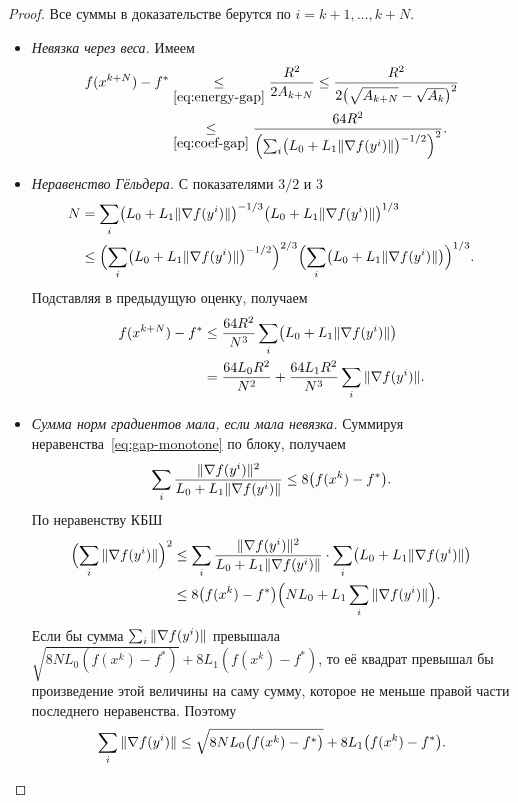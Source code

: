\begin{proof}
Все суммы в доказательстве берутся по $i=k+1,\dots,k+N$.
\begin{itemize}
\item \emph{Невязка через веса.} Имеем
\begin{align*}
 f(x^{k+N})-f^\ast
 &\mathrel{\underset{\eqref{eq:energy-gap}}{\le}}\frac{R^2}{2A_{k+N}}
 \le\frac{R^2}{2\bigl(\sqrt{A_{k+N}}-\sqrt{A_k}\bigr)^2}\\
 &\mathrel{\underset{\eqref{eq:coef-gap}}{\le}}\frac{64R^2}{\Bigl(\sum_i\bigl(L_0+L_1\|\nabla f(y^i)\|\bigr)^{-1/2}\Bigr)^2} .
\end{align*}
\item \emph{Неравенство Гёльдера.} С показателями $3/2$ и $3$
\begin{align*}
 N&=\sum_i\bigl(L_0+L_1\|\nabla f(y^i)\|\bigr)^{-1/3}\bigl(L_0+L_1\|\nabla f(y^i)\|\bigr)^{1/3}\\
 &\le\Bigl(\sum_i\bigl(L_0+L_1\|\nabla f(y^i)\|\bigr)^{-1/2}\Bigr)^{2/3}\Bigl(\sum_i\bigl(L_0+L_1\|\nabla f(y^i)\|\bigr)\Bigr)^{1/3} .
\end{align*}
Подставляя в предыдущую оценку, получаем
\begin{equation}\label{eq:block-g}
\begin{aligned}
 f(x^{k+N})-f^\ast
 &\le\frac{64R^2}{N^3}\sum_i\bigl(L_0+L_1\|\nabla f(y^i)\|\bigr)\\
 &=\frac{64L_0R^2}{N^2}+\frac{64L_1R^2}{N^3}\sum_i\|\nabla f(y^i)\| .
\end{aligned}
\end{equation}
\item \emph{Сумма норм градиентов мала, если мала невязка.} Суммируя неравенства~\eqref{eq:gap-monotone} по блоку, получаем
\[
 \sum_i\frac{\|\nabla f(y^i)\|^2}{L_0+L_1\|\nabla f(y^i)\|}\le8\bigl(f(x^k)-f^\ast\bigr).
\]
По неравенству КБШ
\begin{align*}
 \Bigl(\sum_i\|\nabla f(y^i)\|\Bigr)^2
 &\le\sum_i\frac{\|\nabla f(y^i)\|^2}{L_0+L_1\|\nabla f(y^i)\|}\cdot\sum_i\bigl(L_0+L_1\|\nabla f(y^i)\|\bigr)\\
 &\le8\bigl(f(x^k)-f^\ast\bigr)\Bigl(NL_0+L_1\sum_i\|\nabla f(y^i)\|\Bigr).
\end{align*}
Если бы сумма $\sum_i\|\nabla f(y^i)\|$ превышала $\sqrt{8NL_0(f(x^k)-f^\ast)}+8L_1(f(x^k)-f^\ast)$, то её квадрат превышал бы произведение этой величины на саму сумму, которое не меньше правой части последнего неравенства. Поэтому
\[
 \sum_i\|\nabla f(y^i)\|\le\sqrt{8NL_0\bigl(f(x^k)-f^\ast\bigr)}+8L_1\bigl(f(x^k)-f^\ast\bigr).
\]
\end{itemize}
\end{proof}
